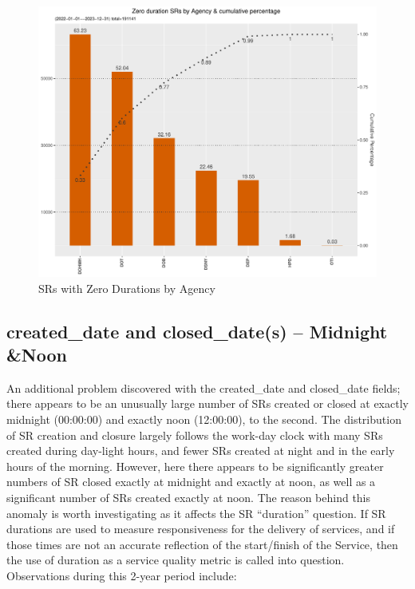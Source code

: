 \documentclass[12pt, titlepage]{article}
\begin{document}
	\begin{figure}[tbp]
		 \centering
		 \includegraphics[width = \textwidth]{zero_duration_SR.pdf}
		 \caption{SRs with Zero Durations by Agency}
		 \label{fig:zero-duration}
	\end{figure}	
		
\subsection{created\_date and closed\_date(s) -- Midnight \&Noon}
\label{sec:midnightandnoon}
	An additional problem discovered with the created\_date and 
	closed\_date fields; there appears to be an unusually large number of SRs 
	created or closed at exactly midnight (00:00:00) and exactly noon (12:00:00), 
	to the second. The distribution of SR creation and closure largely follows the 
	work-day clock with many SRs created during day-light hours, and 
	fewer SRs 	created at night and in the early hours of the morning. However, 
	here there appears to be significantly greater numbers of SR closed exactly 
	at midnight and exactly at noon, as well as a significant number of SRs 
	created exactly at noon. The reason behind this anomaly is worth investigating as 
	it affects the SR ``duration'' question. If SR durations are used to measure 
	responsiveness for the delivery of services, and if those times are not an 
	accurate reflection of the start/finish of the Service, then the use of duration 
	as a service quality metric is called into question. Observations during 
	this 2-year period include:
	
\end{document}
